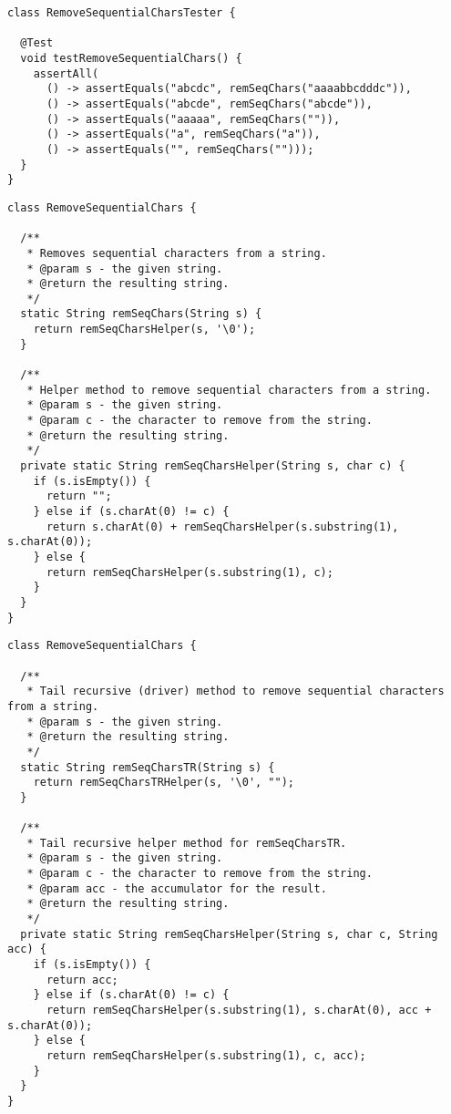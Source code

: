 \begin{lstlisting}[language=MyJava]
class RemoveSequentialCharsTester {

  @Test
  void testRemoveSequentialChars() {
    assertAll(
      () -> assertEquals("abcdc", remSeqChars("aaaabbcdddc")),
      () -> assertEquals("abcde", remSeqChars("abcde")),
      () -> assertEquals("aaaaa", remSeqChars("")),
      () -> assertEquals("a", remSeqChars("a")),
      () -> assertEquals("", remSeqChars("")));
  }
}
\end{lstlisting}

\begin{lstlisting}[language=MyJava]
class RemoveSequentialChars {

  /**
   * Removes sequential characters from a string.
   * @param s - the given string.
   * @return the resulting string.
   */
  static String remSeqChars(String s) {
    return remSeqCharsHelper(s, '\0');
  }

  /**
   * Helper method to remove sequential characters from a string.
   * @param s - the given string.
   * @param c - the character to remove from the string.
   * @return the resulting string.
   */
  private static String remSeqCharsHelper(String s, char c) {
    if (s.isEmpty()) {
      return "";
    } else if (s.charAt(0) != c) {
      return s.charAt(0) + remSeqCharsHelper(s.substring(1), s.charAt(0));
    } else {
      return remSeqCharsHelper(s.substring(1), c);
    }
  }
}
\end{lstlisting}

\begin{lstlisting}[language=MyJava]
class RemoveSequentialChars {

  /**
   * Tail recursive (driver) method to remove sequential characters from a string.
   * @param s - the given string.
   * @return the resulting string.
   */
  static String remSeqCharsTR(String s) {
    return remSeqCharsTRHelper(s, '\0', "");
  }

  /**
   * Tail recursive helper method for remSeqCharsTR.
   * @param s - the given string.
   * @param c - the character to remove from the string.
   * @param acc - the accumulator for the result.
   * @return the resulting string.
   */
  private static String remSeqCharsHelper(String s, char c, String acc) {
    if (s.isEmpty()) {
      return acc;
    } else if (s.charAt(0) != c) {
      return remSeqCharsHelper(s.substring(1), s.charAt(0), acc + s.charAt(0));
    } else {
      return remSeqCharsHelper(s.substring(1), c, acc);
    }
  }
}
\end{lstlisting}

